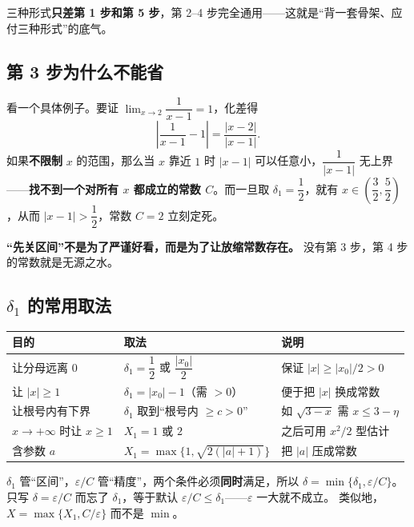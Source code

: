 \documentclass[11pt,a4paper]{ctexart}
\newcommand{\eps}{\varepsilon}
\newcommand{\abs}[1]{\left\lvert #1\right\rvert}
\begin{document}
三种形式\textbf{只差第 1 步和第 5 步}，第 2--4 步完全通用——这就是“背一套骨架、应付三种形式”的底气。

\subsection{第 3 步为什么不能省}

看一个具体例子。要证 $\lim_{x\to2}\dfrac{1}{x-1}=1$，化差得
\[
\abs{\frac{1}{x-1}-1}=\frac{\abs{x-2}}{\abs{x-1}}.
\]
如果\textbf{不限制} $x$ 的范围，那么当 $x$ 靠近 $1$ 时 $\abs{x-1}$ 可以任意小，$\dfrac{1}{\abs{x-1}}$ 无上界——\textbf{找不到一个对所有 $x$ 都成立的常数 $C$}。而一旦取 $\delta_1=\dfrac12$，就有 $x\in\left(\dfrac32,\dfrac52\right)$，从而 $\abs{x-1}>\dfrac12$，常数 $C=2$ 立刻定死。

\begin{keypoint}[一句话]
\textbf{“先关区间”不是为了严谨好看，而是为了让放缩常数存在。}
没有第 3 步，第 4 步的常数就是无源之水。
\end{keypoint}

\subsection{$\delta_1$ 的常用取法}

\begin{center}
\small
\begin{tabular}{@{}lll@{}}
\toprule
目的 & 取法 & 说明 \\
\midrule
让分母远离 $0$ & $\delta_1=\dfrac12$ 或 $\dfrac{\abs{x_0}}{2}$ & 保证 $\abs{x}\ge\abs{x_0}/2>0$ \\
让 $\abs{x}\ge1$ & $\delta_1=\abs{x_0}-1$（需 $>0$） & 便于把 $\abs{x}$ 换成常数 \\
让根号内有下界 & $\delta_1$ 取到“根号内 $\ge c>0$” & 如 $\sqrt{3-x}$ 需 $x\le 3-\eta$ \\
$x\to+\infty$ 时让 $x\ge1$ & $X_1=1$ 或 $2$ & 之后可用 $x^2/2$ 型估计 \\
含参数 $a$ & $X_1=\max\{1,\sqrt{2(\abs{a}+1)}\}$ & 把 $\abs{a}$ 压成常数 \\
\bottomrule
\end{tabular}
\end{center}

\begin{warnbox}
$\delta_1$ 管“区间”，$\eps/C$ 管“精度”，两个条件必须\textbf{同时}满足，所以 $\delta=\min\{\delta_1,\eps/C\}$。
只写 $\delta=\eps/C$ 而忘了 $\delta_1$，等于默认 $\eps/C\le\delta_1$——$\eps$ 一大就不成立。
类似地，$X=\max\{X_1,C/\eps\}$ 而不是 $\min$。
\end{warnbox}
\end{document}
